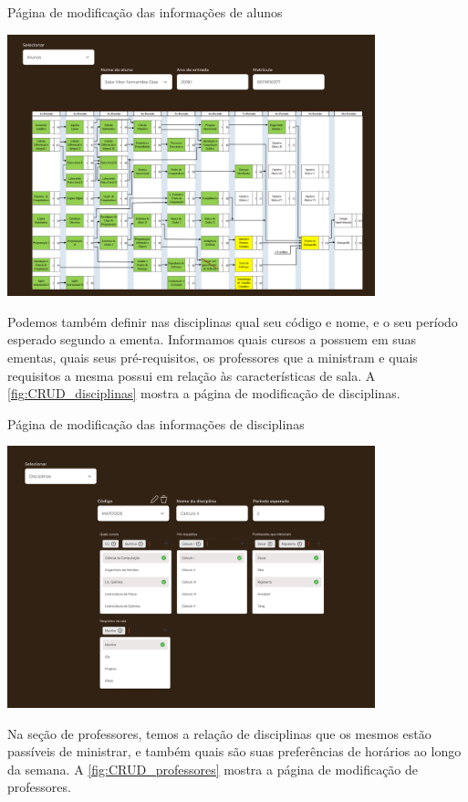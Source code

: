 \begin{MyCenteredFigure}
  \caption{Página de modificação das informações de alunos}
  \label{fig:CRUD_alunos}
  \includegraphics[width=0.8\textwidth]{files/img/Prototipo/Medio/CRUD_alunos}
\end{MyCenteredFigure} %

Podemos também definir nas disciplinas qual seu código e nome, e o seu período esperado segundo a ementa. Informamos quais cursos a possuem em suas ementas, quais seus pré-requisitos, os professores que a ministram e quais requisitos a mesma possui em relação às características de sala. A \autoref{fig:CRUD_disciplinas} mostra a página de modificação de disciplinas.

\begin{MyCenteredFigure}
  \caption{Página de modificação das informações de disciplinas}
  \label{fig:CRUD_disciplinas}
  \includegraphics[width=0.8\textwidth]{files/img/Prototipo/Medio/CRUD_disciplinas}
\end{MyCenteredFigure} %

Na seção de professores, temos a relação de disciplinas que os mesmos estão passíveis de ministrar, e também quais são suas preferências de horários ao longo da semana. A \autoref{fig:CRUD_professores} mostra a página de modificação de professores.


